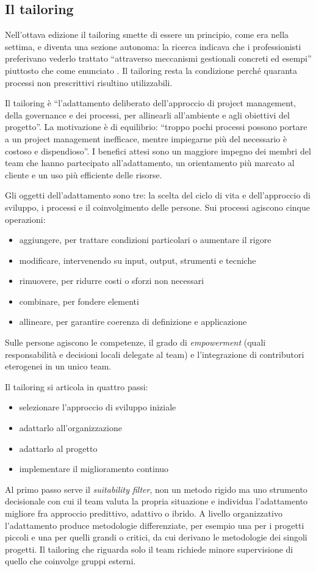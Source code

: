 \subsection{Il tailoring}

Nell'ottava edizione il tailoring smette di essere un principio, come era nella
settima, e diventa una sezione autonoma: la ricerca indicava che i
professionisti preferivano vederlo trattato ``attraverso meccanismi gestionali
concreti ed esempi'' piuttosto che come enunciato \cite{pmbok8}.
Il tailoring resta la condizione perch\'e quaranta
processi non prescrittivi risultino utilizzabili.

Il tailoring \`e ``l'adattamento deliberato dell'approccio di project
management, della governance e dei processi, per allinearli all'ambiente e agli
obiettivi del progetto''. La motivazione \`e di equilibrio: ``troppo pochi
processi possono portare a un project management inefficace, mentre impiegarne
pi\`u del necessario \`e costoso e dispendioso''. I benefici attesi sono un
maggiore impegno dei membri del team che hanno partecipato all'adattamento, un
orientamento pi\`u marcato al cliente e un uso pi\`u efficiente delle risorse.

Gli oggetti dell'adattamento sono tre: la scelta del ciclo di vita e
dell'approccio di sviluppo, i processi e il coinvolgimento delle persone. Sui
processi agiscono cinque operazioni:
\begin {itemize}
\item aggiungere, per trattare condizioni particolari o aumentare il rigore
\item modificare, intervenendo su input, output, strumenti e tecniche
\item rimuovere, per ridurre costi o sforzi non necessari
\item combinare, per fondere elementi
\item allineare, per garantire coerenza di definizione e applicazione
\end {itemize}
Sulle persone agiscono le competenze, il grado di \emph{empowerment} (quali
responsabilit\`a e decisioni locali delegate al team) e l'integrazione di
contributori eterogenei in un unico team.

Il tailoring si articola in quattro passi:
\begin {itemize}
\item selezionare l'approccio di sviluppo iniziale
\item adattarlo all'organizzazione
\item adattarlo al progetto
\item implementare il miglioramento continuo
\end {itemize}
Al primo passo serve il \emph{suitability filter}, non un metodo rigido ma uno
strumento decisionale con cui il team valuta la propria situazione
e individua l'adattamento
migliore fra approccio predittivo, adattivo o ibrido. A livello organizzativo
l'adattamento produce metodologie differenziate, per esempio una per i progetti
piccoli e una per quelli grandi o critici, da cui derivano le metodologie dei
singoli progetti. Il tailoring che riguarda solo il team richiede minore
supervisione di quello che coinvolge gruppi esterni.

